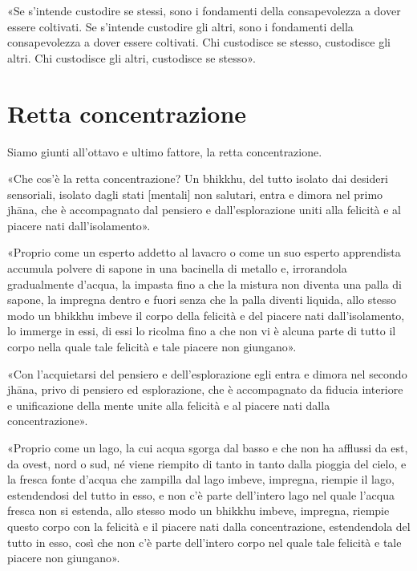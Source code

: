 

«Se s’intende custodire se stessi, sono i fondamenti della
consapevolezza a dover essere coltivati. Se s’intende custodire gli
altri, sono i fondamenti della consapevolezza a dover essere coltivati.
Chi custodisce se stesso, custodisce gli altri. Chi custodisce gli
altri, custodisce se stesso».




\hypertarget{x-retta-concentrazione}{\section*{Retta concentrazione}}
 Siamo giunti all’ottavo e ultimo fattore, la retta
concentrazione.


 «Che cos’è la retta concentrazione? Un bhikkhu, del tutto
isolato dai desideri sensoriali, isolato dagli stati [mentali] non
salutari, entra e dimora nel primo jhāna, che è accompagnato dal
pensiero e dall’esplorazione uniti alla felicità e al piacere nati
dall’isolamento».




«Proprio come un esperto addetto al lavacro o come un suo esperto
apprendista accumula polvere di sapone in una bacinella di metallo e,
irrorandola gradualmente d’acqua, la impasta fino a che la mistura non
diventa una palla di sapone, la impregna dentro e fuori senza che la
palla diventi liquida, allo stesso modo un bhikkhu imbeve il corpo della
felicità e del piacere nati dall’isolamento, lo immerge in essi, di essi
lo ricolma fino a che non vi è alcuna parte di tutto il corpo nella
quale tale felicità e tale piacere non giungano».




«Con l’acquietarsi del pensiero e dell’esplorazione egli entra e dimora
nel secondo jhāna, privo di pensiero ed esplorazione, che è accompagnato
da fiducia interiore e unificazione della mente unite alla felicità e al
piacere nati dalla concentrazione».




«Proprio come un lago, la cui acqua sgorga dal basso e che non ha
afflussi da est, da ovest, nord o sud, né viene riempito di tanto in
tanto dalla pioggia del cielo, e la fresca fonte d’acqua che zampilla
dal lago imbeve, impregna, riempie il lago, estendendosi del tutto in
esso, e non c’è parte dell’intero lago nel quale l’acqua fresca non si
estenda, allo stesso modo un bhikkhu imbeve, impregna, riempie questo
corpo con la felicità e il piacere nati dalla concentrazione,
estendendola del tutto in esso, così che non c’è parte dell’intero corpo
nel quale tale felicità e tale piacere non giungano».



